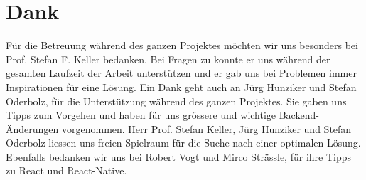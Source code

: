 \chapter*{Dank}
\thispagestyle{scrheadings}

Für die Betreuung während des ganzen Projektes möchten wir uns besonders bei Prof. Stefan F.
Keller bedanken.
Bei Fragen zu  konnte er uns während der gesamten Laufzeit der Arbeit unterstützen und er gab uns bei Problemen immer Inspirationen für eine Lösung. 
Ein Dank geht auch an Jürg Hunziker und Stefan Oderbolz, für die Unterstützung während des ganzen Projektes.
Sie gaben uns Tipps zum Vorgehen und haben für uns grössere und wichtige Backend-Änderungen vorgenommen. 
Herr Prof. Stefan Keller, Jürg Hunziker und Stefan Oderbolz liessen uns freien Spielraum für die Suche nach einer optimalen Lösung.
Ebenfalls bedanken wir uns bei Robert Vogt und Mirco Strässle, für ihre Tipps zu React und React-Native.